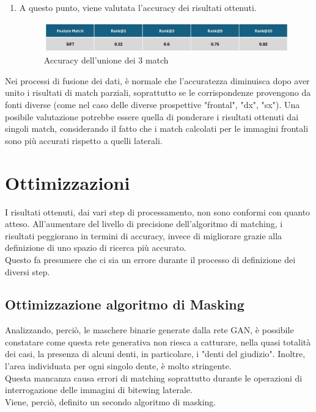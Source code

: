\documentclass[12pt,a4paper,openright,twoside]{book}
\begin{document}
\begin{enumerate}
\item A questo punto, viene valutata l'accuracy dei risultati ottenuti.
\begin{figure}[H]
	\centering
	\hspace{-1cm}
	\includegraphics[width=17cm]{figures/3match.pdf}
    	\caption{Accuracy dell'unione dei 3 match}
	\label{fig:3matches}
\end{figure}
\end{enumerate}

Nei processi di fusione dei dati, è normale che l'accuratezza diminuisca dopo aver unito i risultati di match parziali, soprattutto se le corrispondenze provengono da fonti diverse (come nel caso delle diverse prospettive "frontal", "dx", "sx"). Una posibile valutazione potrebbe essere quella di ponderare i risultati ottenuti dai singoli match, considerando il fatto che i match calcolati per le immagini frontali sono più accurati rispetto a quelli laterali.


\chapter{Ottimizzazioni}
I risultati ottenuti, dai vari step di processamento, non sono conformi con quanto atteso. All'aumentare del livello di precisione dell'algoritmo di matching, i risultati peggiorano in termini di accuracy, invece di migliorare grazie alla definizione di uno spazio di ricerca più accurato.\\
Questo fa presumere che ci sia un errore durante il processo di definizione dei diversi step.

\section{Ottimizzazione algoritmo di Masking}

Analizzando, perciò, le maschere binarie generate dalla rete GAN, è possibile constatare come questa rete generativa non riesca a catturare, nella quasi totalità dei casi, la presenza di alcuni denti, in particolare, i "denti del giudizio". Inoltre, l'area individuata per ogni singolo dente, è molto stringente.\\
Questa mancanza causa errori di matching soprattutto durante le operazioni di interrogazione delle immagini di bitewing laterale.\\
Viene, perciò, definito un secondo algoritmo di masking.
\end{document}

